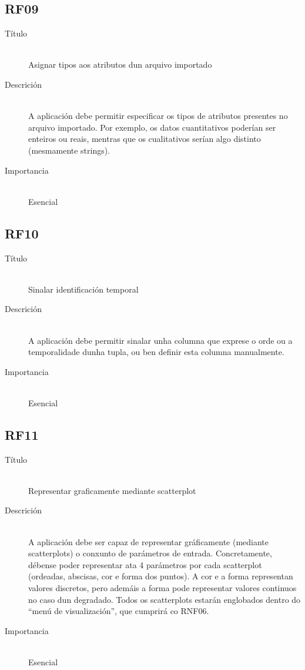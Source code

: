 \subsection*{RF09}
\begin{description}
\item[Título] \hfill \\
Asignar tipos aos atributos dun arquivo importado
\item[Descrición] \hfill \\
A aplicación debe permitir especificar os tipos de atributos presentes no arquivo importado. Por exemplo, os datos cuantitativos poderían ser enteiros ou reais, mentras que os cualitativos serían algo distinto (mesmamente strings).
\item[Importancia] \hfill \\
Esencial
\end{description}

\subsection*{RF10}
\begin{description}
\item[Título] \hfill \\
Sinalar identificación temporal
\item[Descrición] \hfill \\
A aplicación debe permitir sinalar unha columna que exprese o orde ou a temporalidade dunha tupla, ou ben definir esta columna manualmente.
\item[Importancia] \hfill \\
Esencial
\end{description}

\subsection*{RF11}
\begin{description}
\item[Título] \hfill \\
Representar graficamente mediante scatterplot
\item[Descrición] \hfill \\
A aplicación debe ser capaz de representar gráficamente (mediante scatterplots) o conxunto de parámetros de entrada. Concretamente, débense poder representar ata 4 parámetros por cada scatterplot (ordeadas, abscisas, cor e forma dos puntos). A cor e a forma representan valores discretos, pero ademáis a forma pode representar valores continuos no caso dun degradado. Todos os scatterplots estarán englobados dentro do ``menú de visualización'', que cumprirá co RNF06.
\item[Importancia] \hfill \\
Esencial
\end{description}

